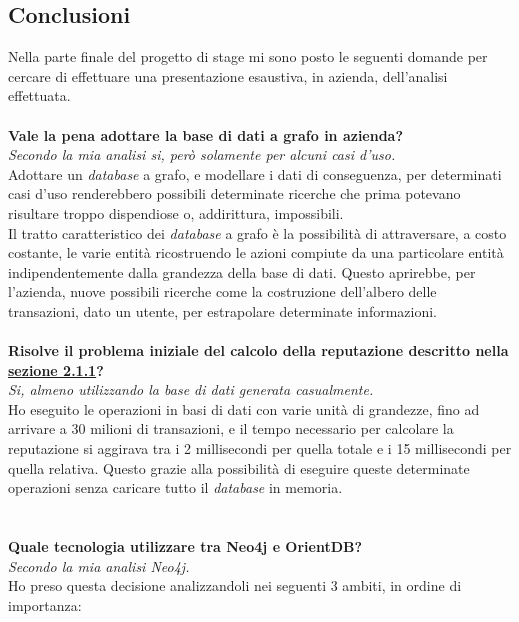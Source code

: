 \subsection{Conclusioni}
Nella parte finale del progetto di stage mi sono posto le seguenti domande per cercare di effettuare una presentazione esaustiva, in azienda, dell'analisi effettuata.\\
\\
\textbf{Vale la pena adottare la base di dati a grafo in azienda?}\\
\textit{Secondo la mia analisi si, però solamente per alcuni casi d'uso.}\\
Adottare un \textit{database} a grafo, e modellare i dati di conseguenza, per determinati casi d'uso renderebbero possibili determinate ricerche che prima potevano risultare troppo dispendiose o, addirittura, impossibili.\\
Il tratto caratteristico dei \textit{database} a grafo è la possibilità di attraversare, a costo costante, le varie entità ricostruendo le azioni compiute da una particolare entità indipendentemente dalla grandezza della base di dati. Questo aprirebbe, per l'azienda, nuove possibili ricerche come la costruzione dell'albero delle transazioni, dato un utente, per estrapolare determinate informazioni.\\
\\
\textbf{Risolve il problema iniziale del calcolo della reputazione descritto nella \hyperlink{sec:prob}{sezione 2.1.1}?}\\
\textit{Si, almeno utilizzando la base di dati generata casualmente.}\\
Ho eseguito le operazioni in basi di dati con varie unità di grandezze, fino ad arrivare a 30 milioni di transazioni, e il tempo necessario per calcolare la reputazione si aggirava tra i 2 millisecondi per quella totale e i 15 millisecondi per quella relativa. Questo grazie alla possibilità di eseguire queste determinate operazioni senza caricare tutto il \textit{database} in memoria.\\
\\
\\
\textbf{Quale tecnologia utilizzare tra Neo4j e OrientDB?}\\
\textit{Secondo la mia analisi Neo4j.}\\
Ho preso questa decisione analizzandoli nei seguenti 3 ambiti, in ordine di importanza:
